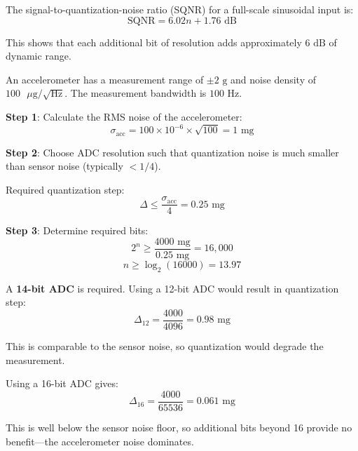 The signal-to-quantization-noise ratio (SQNR) for a full-scale sinusoidal input is:
\begin{equation}
\text{SQNR} = 6.02n + 1.76\text{ dB}
\label{eq:sqnr}
\end{equation}

This shows that each additional bit of resolution adds approximately $6\text{ dB}$ of dynamic range.

\begin{example}
\label{ex:adc_resolution}

An accelerometer has a measurement range of $\pm 2\text{ g}$ and noise density of $100\text{ }\mu\text{g}/\sqrt{\text{Hz}}$. The measurement bandwidth is $100\text{ Hz}$.

\textbf{Step 1}: Calculate the RMS noise of the accelerometer:
\begin{equation}
\sigma_{\text{acc}} = 100 \times 10^{-6} \times \sqrt{100} = 1\text{ mg}
\end{equation}

\textbf{Step 2}: Choose ADC resolution such that quantization noise is much smaller than sensor noise (typically $<1/4$).

Required quantization step:
\begin{equation}
\Delta \leq \frac{\sigma_{\text{acc}}}{4} = 0.25\text{ mg}
\end{equation}

\textbf{Step 3}: Determine required bits:
\begin{equation}
2^n \geq \frac{4000\text{ mg}}{0.25\text{ mg}} = 16{,}000
\end{equation}
\begin{equation}
n \geq \log_2(16000) = 13.97
\end{equation}

A \textbf{14-bit ADC} is required. Using a 12-bit ADC would result in quantization step:
\begin{equation}
\Delta_{12} = \frac{4000}{4096} = 0.98\text{ mg}
\end{equation}

This is comparable to the sensor noise, so quantization would degrade the measurement.

Using a 16-bit ADC gives:
\begin{equation}
\Delta_{16} = \frac{4000}{65536} = 0.061\text{ mg}
\end{equation}

This is well below the sensor noise floor, so additional bits beyond 16 provide no benefit---the accelerometer noise dominates.
\end{example}

